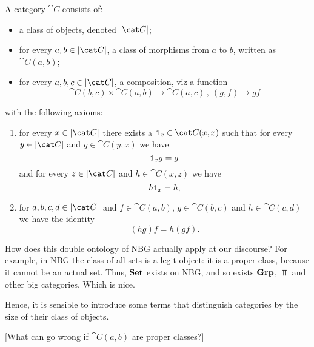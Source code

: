 \begin{definition}[Categories]
A category \(\cat C\) consists of:
\begin{itemize}
\item a class of objects, denoted \(\obj{\cat C}\);
\item for every \(a, b \in \obj{\cat C}\), a class of morphisms from \(a\) to \(b\), written as \(\cat C(a, b)\);
\item for every \(a, b, c \in \obj{\cat C}\), a composition, viz a function
\[\cat C(b, c) \times \cat C(a, b) \to \cat C(a, c) \,, \ (g, f) \to gf\]
\end{itemize}
with the following axioms:
\begin{enumerate}
\item for every \(x \in \obj{\cat C}\) there exists a \(\id_x \in \cat C(x, x)\) such that for every \(y \in \obj{\cat C}\) and \(g \in \cat C(y, x)\) we have
\[\mathtt 1_x g = g\]
and for every \(z \in \obj{\cat C}\) and \(h \in \cat C(x, z)\) we have
\[h \mathtt 1_x = h ;\]
\item for \(a, b, c, d \in \obj{\cat C}\) and \(f \in \cat C(a, b)\), \(g \in \cat C(b, c)\) and \(h \in \cat C(c, d)\) we have the identity
\[(h g) f = h (g f) .\]
\end{enumerate}
\end{definition}

How does this double ontology of NBG actually apply at our discourse? For example, in NBG the class of all sets is a legit object: it is a proper class, because it cannot be an actual set. Thus, \(\mathbf{Set}\) exists on NBG, and so exists \(\mathbf{Grp}\), \(\Top\) and other big categories. Which is nice.

Hence, it is sensible to introduce some terms that distinguish categories by the size of their class of objects.



{\color{red}[What can go wrong if \(\cat C(a, b)\) are proper classes?]}
